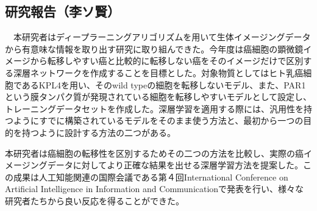 \subsection{研究報告（李ソ賢）}

　本研究者はディープラーニングアリゴリズムを用いて生体イメージングデータから有意味な情報を取り出す研究に取り組んできた。今年度は癌細胞の顕微鏡イメージから転移しやすい癌と比較的に転移しない癌をそのイメージだけで区別する深層ネットワークを作成することを目標とした。対象物質としてはヒト乳癌細胞であるKPL4を用い、そのwild typeの細胞を転移しないモデル、また、PAR1という膜タンパク質が発現されている細胞を転移しやすいモデルとして設定し、トレーニングデータセットを作成した。深層学習を適用する際には、汎用性を持つようにすでに構築されているモデルをそのまま使う方法と、最初から一つの目的を持つように設計する方法の二つがある。

本研究者は癌細胞の転移性を区別するためその二つの方法を比較し、実際の癌イメージングデータに対してより正確な結果を出せる深層学習方法を提案した。この成果は人工知能関連の国際会議である第４回International Conference on Artificial Intelligence in Information and Communicationで発表を行い、様々な研究者たちから良い反応を得ることができた。
